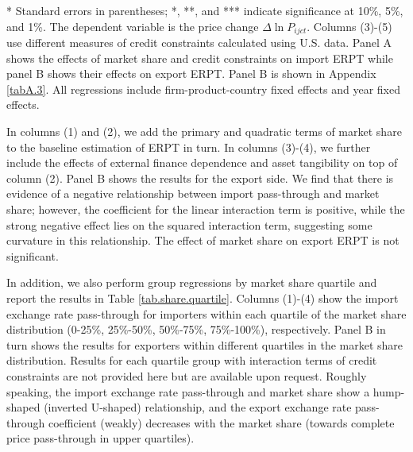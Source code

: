 \documentclass[12pt]{article}
\begin{document}
\begin{table}[htbp]
\begin{threeparttable}
\begin{tabular}{lccccc}
			\bottomrule
		\end{tabular}
		\begin{tablenotes}
			\footnotesize
			\item[*] Standard errors in parentheses; *, **, and *** indicate significance at 10\%, 5\%, and 1\%. The dependent variable is the price change $\Delta \ln P_{ijct}$. Columns (3)-(5) use different measures of credit constraints calculated using U.S. data. Panel A shows the effects of market share and credit constraints on import ERPT while panel B shows their effects on export ERPT. Panel B is shown in Appendix \ref{tabA.3}. All regressions include firm-product-country fixed effects and year fixed effects.
		\end{tablenotes}
	\end{threeparttable}
	\label{tab.share}
\end{table}

In columns (1) and (2), we add the primary and quadratic terms of market share to the baseline estimation of ERPT in turn. In columns (3)-(4), we further include the effects of external finance dependence and asset tangibility on top of column (2). Panel B shows the results for the export side. We find that there is evidence of a negative relationship between import pass-through and market share; however, the coefficient for the linear interaction term is positive, while the strong negative effect lies on the squared interaction term, suggesting some curvature in this relationship. The effect of market share on export ERPT is not significant. 

In addition, we also perform group regressions by market share quartile and report the results in Table \ref{tab.share.quartile}. Columns (1)-(4) show the import exchange rate pass-through for importers within each quartile of the market share distribution (0-25\%, 25\%-50\%, 50\%-75\%, 75\%-100\%), respectively. Panel B in turn shows the results for exporters within different quartiles in the market share distribution. Results for each quartile group with interaction terms of credit constraints are not provided here but are available upon request. Roughly speaking, the import exchange rate pass-through and market share show a hump-shaped (inverted U-shaped) relationship, and the export exchange rate pass-through coefficient (weakly) decreases with the market share (towards complete price pass-through in upper quartiles).
\end{document}
